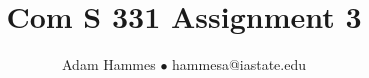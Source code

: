 \documentclass[11pt]{article}
\begin{document}
\title{Com S 331 Assignment 3}
\author{Adam Hammes $\bullet$ hammesa@iastate.edu }
\maketitle
\end{document}
